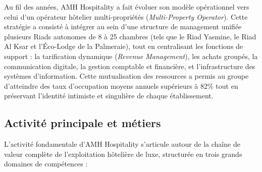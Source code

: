 Au fil des années, AMH Hospitality a fait évoluer son modèle opérationnel vers celui d'un opérateur hôtelier multi-propriétés (\textit{Multi-Property Operator}). Cette stratégie a consisté à intégrer au sein d'une structure de management unifiée plusieurs Riads autonomes de 8 à 25 chambres (tels que le Riad Yasmine, le Riad Al Ksar et l'Éco-Lodge de la Palmeraie), tout en centralisant les fonctions de support : la tarification dynamique (\textit{Revenue Management}), les achats groupés, la communication digitale, la gestion comptable et financière, et l'infrastructure des systèmes d'information. Cette mutualisation des ressources a permis au groupe d'atteindre des taux d'occupation moyens annuels supérieurs à 82\% tout en préservant l'identité intimiste et singulière de chaque établissement.

\subsection{Activité principale et métiers}

L'activité fondamentale d'AMH Hospitality s'articule autour de la chaîne de valeur complète de l'exploitation hôtelière de luxe, structurée en trois grands domaines de compétences :

